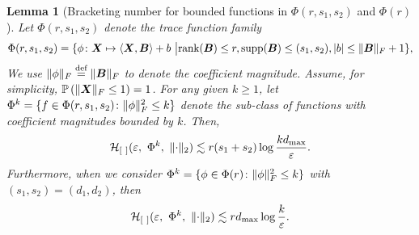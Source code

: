 \documentclass[11pt]{article}
\theoremstyle{plain}
\newtheorem{lem}{Lemma}
\theoremstyle{definition}
\def\rank{\textup{rank}}
\def\supp{\textup{supp}}
\begin{document}
\begin{lem}[Bracketing number for bounded functions in $\Phi(r,s_1,s_2)$ and $\Phi(r)$]\label{lem:entropy}
Let $\Phi(r,s_1,s_2)$ denote the  trace function family 
\begin{align*} 
\Phi(r,s_1,s_2)=\{\phi\colon \mX\mapsto \langle \mX, \mB \rangle +b \ \big| \rank(\mB)\leq r,  \supp(\mB)\leq (s_1,s_2), |b|\leq \FnormSize{}{\mB}+1\},
\end{align*}
We use $\lVert\phi\rVert_F\stackrel{\textup{def}}{=}\lVert\bm B\rVert_F$ to denote the coefficient magnitude.
Assume, for simplicity, $\mathbb{P}\left(\lVert\bm X\rVert_F\leq 1\right)=1$. For any given $k\geq 1$, let $\Phi^k=\{f\in \Phi(r,s_1,s_2)\colon \lVert\phi\rVert_F^2 \leq k\}$ denote the sub-class of functions with coefficient magnitudes bounded by $k$. Then, 
\[
\tH_{[\ ]}(\varepsilon,\ \Phi^k,\ \vnormSize{}{\cdot}) \lesssim r(s_1+s_2) \log {kd_{\max}\over \varepsilon }.
\]
Furthermore, when we consider $\Phi^k = \{\phi\in\Phi(r)\colon \lVert\phi\rVert_F^2\leq k \}$ with $(s_1,s_2) = (d_1,d_2)$, then
\[
\tH_{[\ ]}(\varepsilon,\ \Phi^k,\ \vnormSize{}{\cdot}) \lesssim rd_{\max} \log {k\over \varepsilon }.
\]
\end{lem}
\end{document}

